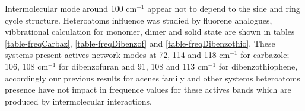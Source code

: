 Intermolecular mode around 100 cm$^{-1}$ appear not to depend to the side and ring cycle structure. Heteroatoms influence was studied by fluorene analogues, vibbrational calculation for monomer, dimer and solid state are shown in tables \ref{table-freqCarbaz}, \ref{table-freqDibenzof} and \ref{table-freqDibenzothio}. These systems present actives network modes at 72, 114 and 118 cm$^{-1}$ for carbazole; 106, 108 cm$^{-1}$ for dibenzofuran and 91, 108 and 113 cm$^{-1}$ for dibenzothiophene, accordingly our previous results for acenes family and other systems heteroatoms presence have not impact in frequence values for these actives bands which are produced by intermolecular interactions. 

 
 \begin{table}[H]
 	\begin{center}
 		\caption{The \textit{bc} and \textit{ab} planes of Carbazole crystal}  \label{fig-carbazolesol}
 		\end{center}
 	\end{table}
 
